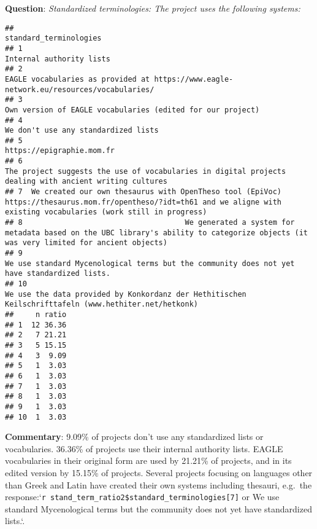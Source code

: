 \documentclass[
]{article}
\begin{document}
\textbf{Question}: \emph{Standardized terminologies: The project uses
the following systems:}

\begin{verbatim}
##                                                                                                                                                      standard_terminologies
## 1                                                                                                                                                  Internal authority lists
## 2                                                                                    EAGLE vocabularies as provided at https://www.eagle-network.eu/resources/vocabularies/
## 3                                                                                                                Own version of EAGLE vocabularies (edited for our project)
## 4                                                                                                                                       We don't use any standardized lists
## 5                                                                                                                                                 https://epigraphie.mom.fr
## 6                                                                    The project suggests the use of vocabularies in digital projects dealing with ancient writing cultures
## 7  We created our own thesaurus with OpenTheso tool (EpiVoc) https://thesaurus.mom.fr/opentheso/?idt=th61 and we aligne with existing vocabularies (work still in progress)
## 8                                     We generated a system for metadata based on the UBC library's ability to categorize objects (it was very limited for ancient objects)
## 9                                                                               We use standard Mycenological terms but the community does not yet have standardized lists.
## 10                                                                     We use the data provided by Konkordanz der Hethitischen Keilschrifttafeln (www.hethiter.net/hetkonk)
##     n ratio
## 1  12 36.36
## 2   7 21.21
## 3   5 15.15
## 4   3  9.09
## 5   1  3.03
## 6   1  3.03
## 7   1  3.03
## 8   1  3.03
## 9   1  3.03
## 10  1  3.03
\end{verbatim}

\textbf{Commentary}: 9.09\% of projects don't use any standardized lists
or vocabularies. 36.36\% of projects use their internal authority lists.
EAGLE vocabularies in their original form are used by 21.21\% of
projects, and in its edited version by 15.15\% of projects. Several
projects focusing on languages other than Greek and Latin have created
their own systems including thesauri, e.g.~the
response:`\texttt{r\ stand\_term\_ratio2\$standard\_terminologies{[}7{]}}
or We use standard Mycenological terms but the community does not yet
have standardized lists.`.
\end{document}

